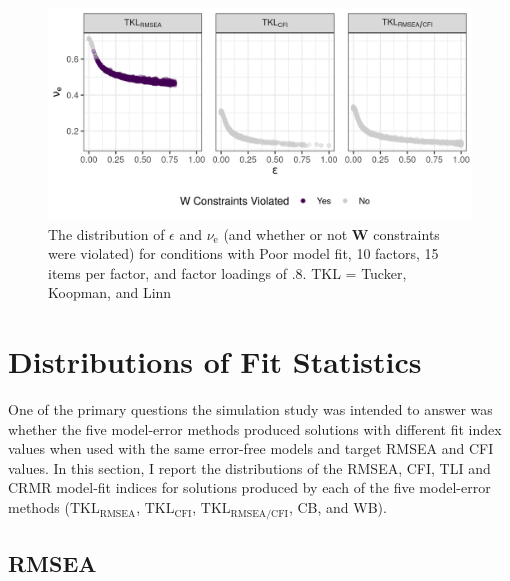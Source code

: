 \documentclass[11pt]{umnthesis}
\begin{document}
\begin{figure}

{\centering \includegraphics[width=0.8\linewidth]{img/eps_and_nu_violation_example} 

}

\caption[The distribution of $\epsilon$ and $\nu_{\textrm{e}}$ (and whether or not $\mathbf{W}$ constraints were violated) for conditions with Poor model fit, 10 factors, 15 items per factor, and factor loadings of .8]{The distribution of $\epsilon$ and $\nu_{\textrm{e}}$ (and whether or not $\mathbf{W}$ constraints were violated) for conditions with Poor model fit, 10 factors, 15 items per factor, and factor loadings of .8. TKL = Tucker, Koopman, and Linn}\label{fig:w-violation-example}
\end{figure}

\hypertarget{distributions-of-fit-statistics}{%
\section{Distributions of Fit Statistics}\label{distributions-of-fit-statistics}}

One of the primary questions the simulation study was intended to answer was whether the five model-error methods produced solutions with different fit index values when used with the same error-free models and target RMSEA and CFI values. In this section, I report the distributions of the RMSEA, CFI, TLI and CRMR model-fit indices for solutions produced by each of the five model-error methods (\(\textrm{TKL}_{\textrm{RMSEA}}\), \(\textrm{TKL}_{\textrm{CFI}}\), \(\textrm{TKL}_{\textrm{RMSEA/CFI}}\), CB, and WB).

\hypertarget{rmsea}{%
\subsection{RMSEA}\label{rmsea}}
\end{document}
